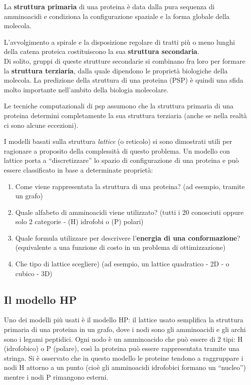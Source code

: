 \documentclass[conference]{IEEEtran}
\begin{document}
La \textbf{struttura primaria} di una proteina è data dalla pura sequenza di amminoacidi e condiziona la configurazione spaziale e la forma globale della molecola.

L'avvolgimento a spirale e la disposizione regolare di tratti più o meno lunghi della catena proteica costituiscono la sua \textbf{struttura secondaria}.\\

Di solito, gruppi di queste strutture secondarie si combinano fra loro per formare la \textbf{struttura terziaria}, dalla quale dipendono le proprietà biologiche della molecola. La predizione della struttura di una proteina (PSP) è quindi una sfida molto importante nell'ambito della biologia molecolare.

Le tecniche computazionali di psp assumono che la struttura primaria di una proteina determini completamente la sua struttura terziaria (anche se nella realtà ci sono alcune eccezioni).

I modelli basati sulla struttura \textit{lattice} (o reticolo) si sono dimostrati utili per ragionare a proposito della complessità di questo problema. Un modello con lattice porta a ``discretizzare'' lo spazio di configurazione di una proteina e può essere classificato in base a determinate proprietà:

\begin{enumerate}
 \item Come viene rappresentata la struttura di una proteina? (ad esempio, tramite un grafo)
 \item Quale alfabeto di amminoacidi viene utilizzato? (tutti i 20 conosciuti oppure solo 2 categorie - (H) idrofobi o (P) polari)
 \item Quale formula utilizzare per descrivere l'\textbf{energia di una conformazione}? (equivalente a una funzione di costo in un problema di ottimizzazione)
 \item Che tipo di lattice scegliere) (ad esempio, un lattice quadratico - 2D - o cubico - 3D)
\end{enumerate}

\subsection{Il modello HP}

Uno dei modelli più usati è il modello HP: il lattice usato semplifica la struttura primaria di una proteina in un grafo, dove i nodi sono gli amminoacidi e gli archi sono i legami peptidici. Ogni nodo è un amminoacido che può essere di 2 tipi: H (idrofobico) o P (polare), così la proteina può essere rappresentata tramite una stringa. Si è osservato che in questo modello le proteine tendono a raggruppare i nodi H attorno a un punto (cioè gli amminoacidi idrofobici formano un ``nucleo'') mentre i nodi P rimangono esterni.
\end{document}
